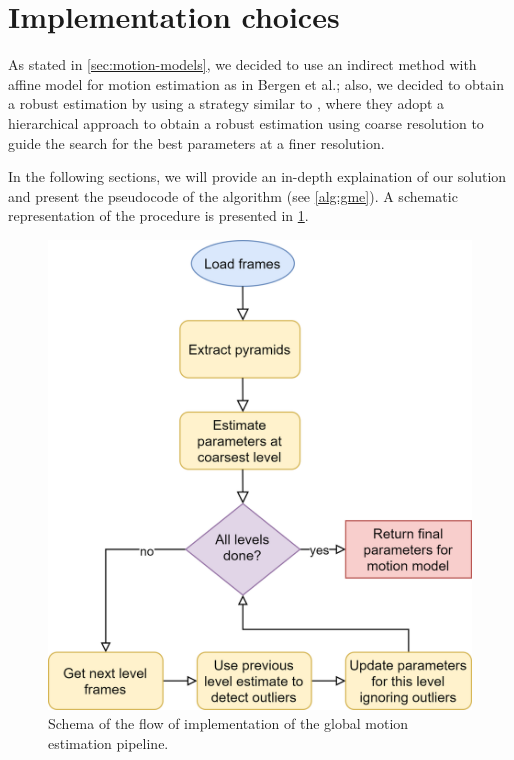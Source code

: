\section{Implementation choices}
\label{sec:03-implementation}

As stated in \cref{sec:motion-models}, we decided to use an indirect method with affine model for motion estimation as in Bergen et al.\cite{Bergen92}; also, we decided to obtain a robust estimation by using a strategy similar to \cite{Dufeaux2000,Ayer94,He01}, where they adopt a hierarchical approach to obtain a robust estimation using coarse resolution to guide the search for the best parameters at a finer resolution.

In the following sections, we will provide an in-depth explaination of our solution and present the pseudocode of the algorithm (see \cref{alg:gme}). A schematic representation of the procedure is presented in \cref{fig:implementation-flow}.

\begin{figure}
    \centering
    \includegraphics[width=.95\linewidth]{../assets/images/implementation-flow.png}
    \caption{Schema of the flow of implementation of the global motion estimation pipeline.}
    \label{fig:implementation-flow}
\end{figure}

